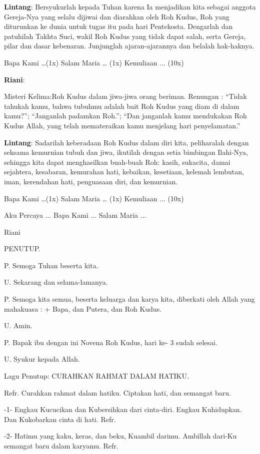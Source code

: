 \documentclass[12pt]{article}
\def\petugasA{\textbf{Riani}}
\def\petugasB{\textbf{Lintang}}
\begin{document}
\petugasB: Bersyukurlah kepada Tuhan karena Ia menjadikan kita sebagai
anggota Gereja-Nya yang selalu dijiwai dan diarahkan oleh Roh Kudus,
Roh yang diturunkan ke dunia untuk tugas itu pada hari Pentekosta.
Dengarlah dan patuhilah Takhta Suci, wakil Roh Kudus yang tidak dapat
salah, serta Gereja, pilar dan dasar kebenaran. Junjunglah
ajaran-ajarannya dan belalah hak-haknya.

 Bapa Kami {\dots}(1x) Salam Maria {\dots} (1x) Kemuliaan ... (10x)

\petugasA:

Misteri Kelima:{\textquotedbl}Roh Kudus dalam jiwa-jiwa orang
beriman.{\textquotedbl} Renungan : {\textquotedblleft}Tidak tahukah
kamu, bahwa tubuhmu adalah bait Roh Kudus yang diam di dalam
kamu?{\textquotedblright}; {\textquotedblleft}Janganlah padamkan
Roh.{\textquotedblright}; {\textquotedblleft}Dan janganlah kamu
mendukakan Roh Kudus Allah, yang telah memateraikan kamu menjelang hari
penyelamatan.{\textquotedblright}

\petugasB: Sadarilah keberadaan Roh Kudus dalam diri kita, peliharalah dengan
seksama kemurnian tubuh dan jiwa, ikutilah dengan setia bimbingan
Ilahi-Nya, sehingga kita dapat menghasilkan buah-buah Roh: kasih,
sukacita, damai sejahtera, kesabaran, kemurahan hati, kebaikan,
kesetiaan, kelemah lembutan, iman, kerendahan hati, penguasaan diri,
dan kemurnian.

 Bapa Kami {\dots}(1x) Salam Maria {\dots} (1x) Kemuliaan ... (10x)

Aku Percaya ... Bapa Kami ... Salam Maria ...

Riani 

PENUTUP.

P. Semoga Tuhan beserta kita.

U. Sekarang dan selama-lamanya.

P. Semoga kita semua, beserta keluarga dan karya kita, diberkati oleh
Allah yang mahakuasa : + Bapa, dan Putera, dan Roh Kudus.

U. Amin.

P. Bapak ibu dengan ini Novena Roh Kudus, hari ke- 3 sudah selesai.

U. Syukur kepada Allah.

 Lagu Penutup:  CURAHKAN RAHMAT DALAM HATIKU.

Refr. Curahkan rahmat dalam hatiku. Ciptakan hati, dan semangat baru.

{}-1- Engkau Kucucikan dan Kubersihkan dari cinta-diri. Engkau
Kuhidupkan. Dan Kukobarkan cinta di hati. Refr. 

{}-2- Hatimu yang kaku, keras, dan beku, Kuambil darimu. Ambillah
dari-Ku semangat baru dalam karyamu. Refr.
\end{document}
